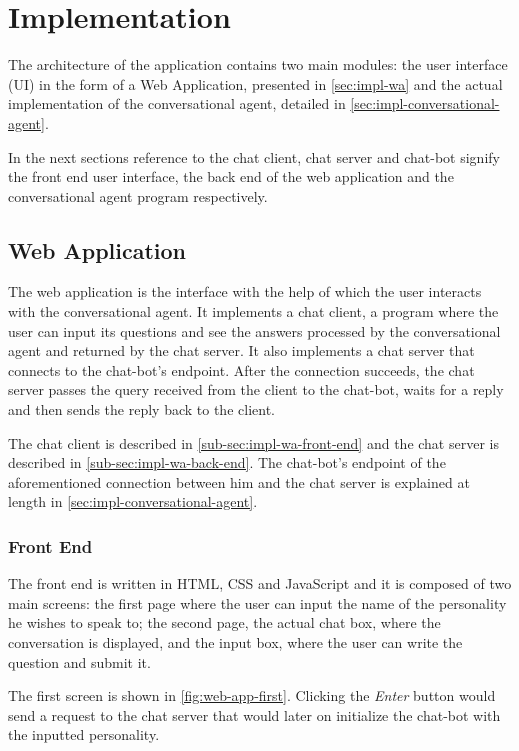\chapter{Implementation}
\label{chapter:implementation}

The architecture of the application contains two main modules: the user interface (UI) in the form of a Web Application, presented in \autoref{sec:impl-wa} and the actual implementation of the conversational agent, detailed in \autoref{sec:impl-conversational-agent}.

In the next sections reference to the chat client, chat server and chat-bot signify the front end user interface, the back end of the web application and the conversational agent program respectively.

\section{Web Application}
\label{sec:impl-wa}

The web application is the interface with the help of which the user interacts with the conversational agent. It implements a chat client, a program where the user can input its questions and see the answers processed by the conversational agent and returned by the chat server. It also implements a chat server that connects to the chat-bot's endpoint. After the connection succeeds, the chat server passes the query received from the client to the chat-bot, waits for a reply and then sends the reply back to the client.

The chat client is described in \autoref{sub-sec:impl-wa-front-end} and the chat server is described in \autoref{sub-sec:impl-wa-back-end}. The chat-bot's endpoint of the aforementioned connection between him and the chat server is explained at length in \autoref{sec:impl-conversational-agent}.

\subsection{Front End}
\label{sub-sec:impl-wa-front-end}

The front end is written in HTML, CSS and JavaScript and it is composed of two main screens: the first page where the user can input the name of the personality he wishes to speak to; the second page, the actual chat box, where the conversation is displayed, and the input box, where the user can write the question and submit it.

The first screen is shown in \autoref{fig:web-app-first}. Clicking the {\em Enter} button would send a request to the chat server that would later on initialize the chat-bot with the inputted personality.

